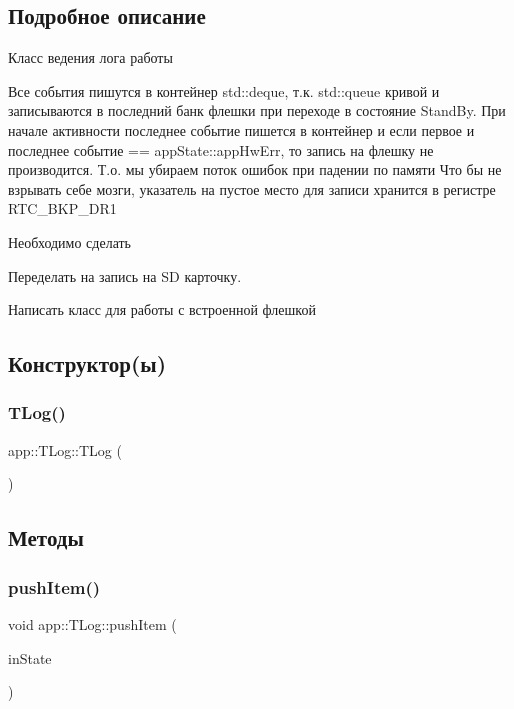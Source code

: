 \subsection{Подробное описание}
Класс ведения лога работы 

Все события пишутся в контейнер std\+::deque, т.\+к. std\+::queue кривой и записываются в последний банк флешки при переходе в состояние Stand\+By. При начале активности последнее событие пишется в контейнер и если первое и последнее событие == app\+State\+::app\+Hw\+Err, то запись на флешку не производится. Т.\+о. мы убираем поток ошибок при падении по памяти Что бы не взрывать себе мозги, указатель на пустое место для записи хранится в регистре R\+T\+C\+\_\+\+B\+K\+P\+\_\+\+D\+R1 \begin{DoxyRefDesc}{Необходимо сделать}
\item[\hyperlink{todo__todo000009}{Необходимо сделать}]Переделать на запись на SD карточку. 

Написать класс для работы с встроенной флешкой \end{DoxyRefDesc}


\subsection{Конструктор(ы)}
\mbox{\label{classapp_1_1_t_log_a9f8a10a82504933ab909b90ea9413b65}} 
\subsubsection{\texorpdfstring{T\+Log()}{TLog()}}
{\footnotesize\ttfamily app\+::\+T\+Log\+::\+T\+Log (\begin{DoxyParamCaption}{ }\end{DoxyParamCaption})}



 

\subsection{Методы}
\mbox{\label{classapp_1_1_t_log_a9632f9ff3d14bd24d6587f3509fbe9de}} 
\subsubsection{\texorpdfstring{push\+Item()}{pushItem()}}
{\footnotesize\ttfamily void app\+::\+T\+Log\+::push\+Item (\begin{DoxyParamCaption}\item[{const \hyperlink{namespaceapp_a290e8080c661e52c2f685fd4af148acf}{app\+::app\+State} \&}]{in\+State }\end{DoxyParamCaption})}



